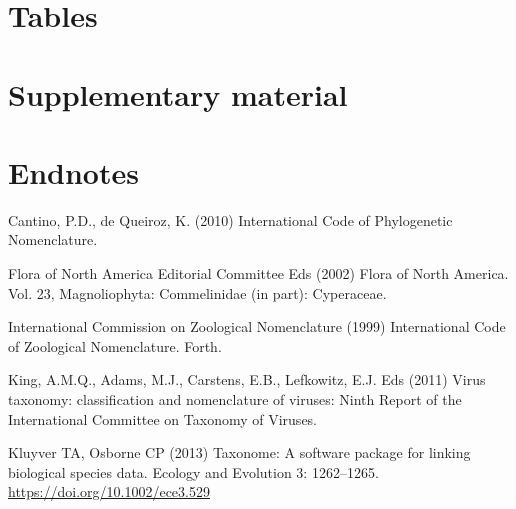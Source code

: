 \documentclass[
]{article}
\newlength{\cslhangindent}
\newlength{\cslentryspacingunit} %
\newenvironment{CSLReferences}[2] %
 {%
  \setlength{\parindent}{0pt}
  \ifodd #1
  \let\oldpar\par
  \def\par{\hangindent=\cslhangindent\oldpar}
  \fi
  \setlength{\parskip}{#2\cslentryspacingunit}
 }%
 {}
\begin{document}
\hypertarget{tables}{%
\section{Tables}\label{tables}}

\hypertarget{supplementary-material}{%
\section{Supplementary material}\label{supplementary-material}}

\hypertarget{endnotes}{%
\section*{Endnotes}\label{endnotes}}

\hypertarget{refs}{}
\begin{CSLReferences}{1}{0}
\leavevmode{}%
Cantino, P.D., de Queiroz, K. (2010) {International Code of Phylogenetic
Nomenclature}.

\leavevmode{}%
Flora of North America Editorial Committee Eds (2002) {Flora of North
America. Vol. 23, Magnoliophyta: Commelinidae (in part): Cyperaceae}.

\leavevmode{}%
International Commission on Zoological Nomenclature (1999)
{International Code of Zoological Nomenclature}. Forth.

\leavevmode{}%
King, A.M.Q., Adams, M.J., Carstens, E.B., Lefkowitz, E.J. Eds (2011)
{Virus taxonomy: classification and nomenclature of viruses: Ninth
Report of the International Committee on Taxonomy of Viruses.}

\leavevmode{}%
Kluyver TA, Osborne CP (2013) Taxonome: A software package for linking
biological species data. Ecology and Evolution 3: 1262--1265.
\url{https://doi.org/10.1002/ece3.529}

\end{CSLReferences}
\end{document}
